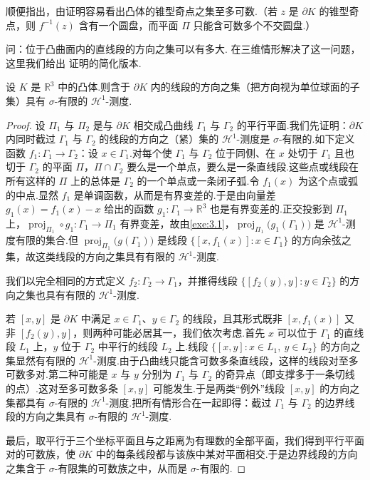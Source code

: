 顺便指出，由证明容易看出凸体的锥型奇点之集至多可数.（若 $z$ 是 $\partial K$ 的锥型奇点，则 $f^{-1}(z)$ 含有一个圆盘，而平面 $\Pi$ 只能含可数多个不交圆盘.）

\textcite{klee1957} 问：位于凸曲面内的直线段的方向之集可以有多大.\textcite{mcminn1960} 在三维情形解决了这一问题，这里我们给出 \textcite{besicovitch1963b} 证明的简化版本.

\begin{theorem}\label{thm:8.19}
设 $K$ 是 $\mathbb{R}^3$ 中的凸体.则含于 $\partial K$ 内的线段的方向之集（把方向视为单位球面的子集）具有 $\sigma$-有限的 $\mathcal{H}^1$-测度.
\end{theorem}

\begin{proof}
设 $\Pi_1$ 与 $\Pi_2$ 是与 $\partial K$ 相交成凸曲线 $\Gamma_1$ 与 $\Gamma_2$ 的平行平面.我们先证明：$\partial K$ 内同时截过 $\Gamma_1$ 与 $\Gamma_2$ 的线段的方向之（紧）集的 $\mathcal{H}^1$-测度是 $\sigma$-有限的.如下定义函数 $f_1:\Gamma_1\to\Gamma_2$：设 $x\in\Gamma_1$.对每个使 $\Gamma_1$ 与 $\Gamma_2$ 位于同侧、在 $x$ 处切于 $\Gamma_1$ 且也切于 $\Gamma_2$ 的平面 $\Pi$，$\Pi\cap\Gamma_2$ 要么是一个单点，要么是一条直线段.这些点或线段在所有这样的 $\Pi$ 上的总体是 $\Gamma_2$ 的一个单点或一条闭子弧.令 $f_1(x)$ 为这个点或弧的中点.显然 $f_1$ 是单调函数，从而是有界变差的.于是由向量差 $g_1(x)=f_1(x)-x$ 给出的函数 $g_1:\Gamma_1\to\mathbb{R}^3$ 也是有界变差的.正交投影到 $\Pi_1$ 上，$\operatorname{proj}_{\Pi_1}\circ g_1:\Gamma_1\to\Pi_1$ 有界变差，故由\cref{exe:3.1}，$\operatorname{proj}_{\Pi_1}\bigl(g_1(\Gamma_1)\bigr)$ 是 $\mathcal{H}^1$-测度有限的集合.但 $\operatorname{proj}_{\Pi_1}\bigl(g(\Gamma_1)\bigr)$ 是线段 $\{[x,f_1(x)]:x\in\Gamma_1\}$ 的方向余弦之集，故这类线段的方向之集具有有限的 $\mathcal{H}^1$-测度.

我们以完全相同的方式定义 $f_2:\Gamma_2\to\Gamma_1$，并推得线段 $\{[f_2(y),y]:y\in\Gamma_2\}$ 的方向之集也具有有限的 $\mathcal{H}^1$-测度.

若 $[x,y]$ 是 $\partial K$ 中满足 $x\in\Gamma_1$、$y\in\Gamma_2$ 的线段，且其形式既非 $[x,f_1(x)]$ 又非 $[f_2(y),y]$，则两种可能必居其一，我们依次考虑.首先 $x$ 可以位于 $\Gamma_1$ 的直线段 $L_1$ 上，$y$ 位于 $\Gamma_2$ 中平行的线段 $L_2$ 上.线段 $\{[x,y]:x\in L_1,\ y\in L_2\}$ 的方向之集显然有有限的 $\mathcal{H}^1$-测度.由于凸曲线只能含可数多条直线段，这样的线段对至多可数多对.第二种可能是 $x$ 与 $y$ 分别为 $\Gamma_1$ 与 $\Gamma_2$ 的奇异点（即支撑多于一条切线的点）.这对至多可数多条 $[x,y]$ 可能发生.于是两类``例外''线段 $[x,y]$ 的方向之集都具有 $\sigma$-有限的 $\mathcal{H}^1$-测度.把所有情形合在一起即得：截过 $\Gamma_1$ 与 $\Gamma_2$ 的边界线段的方向之集具有 $\sigma$-有限的 $\mathcal{H}^1$-测度.

最后，取平行于三个坐标平面且与之距离为有理数的全部平面，我们得到平行平面对的可数族，使 $\partial K$ 中的每条线段都与该族中某对平面相交.于是边界线段的方向之集含于 $\sigma$-有限集的可数族之中，从而是 $\sigma$-有限的.
\end{proof}

